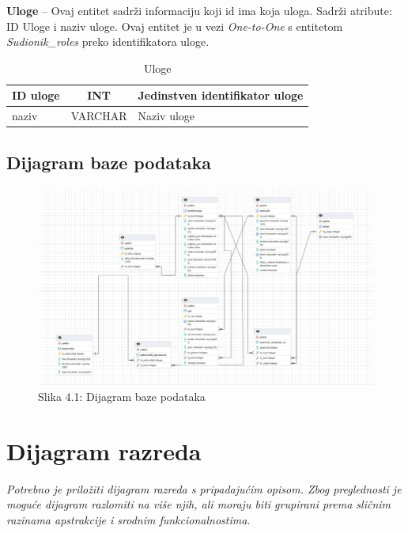 \textbf{Uloge} – Ovaj entitet sadrži informaciju koji id ima koja uloga. Sadrži atribute: ID Uloge i naziv uloge. Ovaj entitet je u vezi \textit{One-to-One} s entitetom \textit{Sudionik_roles} preko identifikatora uloge.

\begin{table}[H]
	\caption{Uloge}
	\label{tbl:uloge}
	\centering
	\begin{tabular}{|l|c|l|} 
		\hline
		\cellcolor{lightblue}ID uloge & INT & Jedinstven identifikator uloge\\ 
		\hline
		naziv & VARCHAR & Naziv uloge\\ 
		\hline
	\end{tabular}
\end{table}		
			
\subsection{Dijagram baze podataka}

\begin{figure}[htb]
	\centering
	\includegraphics[width=15cm]{slike/dijagram.jpg}
	\caption{Slika 4.1: Dijagram baze podataka}
	\label{fig:fer-logo}
\end{figure}
			
			\eject
			
			
		\section{Dijagram razreda}
		
			\textit{Potrebno je priložiti dijagram razreda s pripadajućim opisom. Zbog preglednosti je moguće dijagram razlomiti na više njih, ali moraju biti grupirani prema sličnim razinama apstrakcije i srodnim funkcionalnostima.}\\
			
